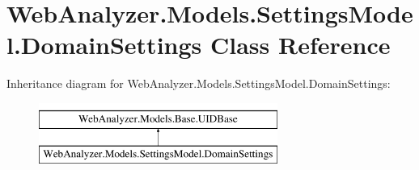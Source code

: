 \hypertarget{class_web_analyzer_1_1_models_1_1_settings_model_1_1_domain_settings}{}\section{Web\+Analyzer.\+Models.\+Settings\+Model.\+Domain\+Settings Class Reference}
\label{class_web_analyzer_1_1_models_1_1_settings_model_1_1_domain_settings}
Inheritance diagram for Web\+Analyzer.\+Models.\+Settings\+Model.\+Domain\+Settings\+:\begin{figure}[H]
\begin{center}
\leavevmode
\includegraphics[height=2.000000cm]{class_web_analyzer_1_1_models_1_1_settings_model_1_1_domain_settings}
\end{center}
\end{figure}
